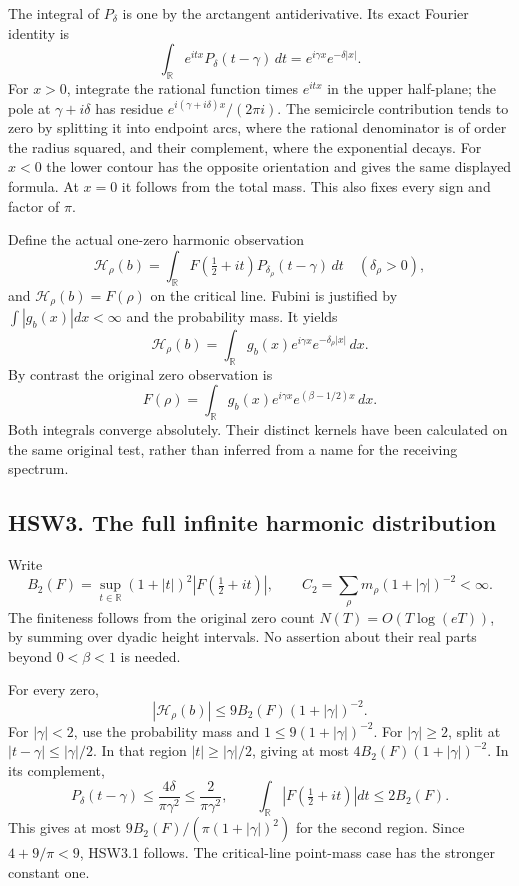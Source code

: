 The integral of \(P_\delta\) is one by the arctangent antiderivative.
Its exact Fourier identity is \[
\int_{\mathbb R}e^{itx}P_\delta(t-\gamma)\,dt
=e^{i\gamma x}e^{-\delta|x|}.
\tag{HSW2.2}
\] For \(x>0\), integrate the rational function times \(e^{itx}\) in the
upper half-plane; the pole at \(\gamma+i\delta\) has residue
\(e^{i(\gamma+i\delta)x}/(2\pi i)\). The semicircle contribution tends
to zero by splitting it into endpoint arcs, where the rational
denominator is of order the radius squared, and their complement, where
the exponential decays. For \(x<0\) the lower contour has the opposite
orientation and gives the same displayed formula. At \(x=0\) it follows
from the total mass. This also fixes every sign and factor of \(\pi\).

Define the actual one-zero harmonic observation \[
\mathcal H_\rho(b)=
\int_{\mathbb R}F(\tfrac12+it)P_{\delta_\rho}(t-\gamma)\,dt
\quad(\delta_\rho>0),
\] and \(\mathcal H_\rho(b)=F(\rho)\) on the critical line. Fubini is
justified by \(\int|g_b(x)|dx<\infty\) and the probability mass. It
yields \[
\boxed{\mathcal H_\rho(b)=
\int_{\mathbb R}g_b(x)e^{i\gamma x}e^{-\delta_\rho|x|}\,dx.}
\tag{HSW2.3}
\] By contrast the original zero observation is \[
F(\rho)=\int_{\mathbb R}g_b(x)e^{i\gamma x}
e^{(\beta-1/2)x}\,dx.
\tag{HSW2.4}
\] Both integrals converge absolutely. Their distinct kernels have been
calculated on the same original test, rather than inferred from a name
for the receiving spectrum.

\subsection{HSW3. The full infinite harmonic
distribution}\label{hsw3.-the-full-infinite-harmonic-distribution}

Write \[
B_2(F)=\sup_{t\in\mathbb R}(1+|t|)^2|F(\tfrac12+it)|,\qquad
C_2=\sum_\rho m_\rho(1+|\gamma|)^{-2}<\infty.
\] The finiteness follows from the original zero count
\(N(T)=O(T\log(eT))\), by summing over dyadic height intervals. No
assertion about their real parts beyond \(0<\beta<1\) is needed.

For every zero, \[
|\mathcal H_\rho(b)|\le9B_2(F)(1+|\gamma|)^{-2}.
\tag{HSW3.1}
\] For \(|\gamma|<2\), use the probability mass and
\(1\le9(1+|\gamma|)^{-2}\). For \(|\gamma|\ge2\), split at
\(|t-\gamma|\le|\gamma|/2\). In that region \(|t|\ge|\gamma|/2\), giving
at most \(4B_2(F)(1+|\gamma|)^{-2}\). In its complement, \[
P_\delta(t-\gamma)\le\frac{4\delta}{\pi\gamma^2}
\le\frac2{\pi\gamma^2},\qquad
\int_{\mathbb R}|F(\tfrac12+it)|dt\le2B_2(F).
\] This gives at most \(9B_2(F)/(\pi(1+|\gamma|)^2)\) for the second
region. Since \(4+9/\pi<9\), HSW3.1 follows. The critical-line
point-mass case has the stronger constant one.

